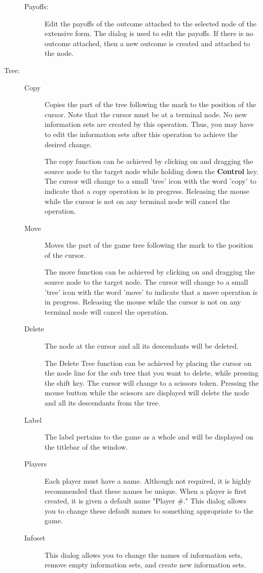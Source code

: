 \begin{description}
\begin{description}
\item[Payoffs:] Edit the payoffs of the outcome attached to the
selected node of the extensive form. The  dialog is used to edit the payoffs. If there is
no outcome attached, then a new outcome is created and attached to the
node.
\end{description}
\item[Tree:]
\begin{description}
\item[Copy] Copies the part of the tree following the mark to the
position of the cursor.  Note that the cursor must be at a terminal
node.  No new information sets are created by this operation.  Thus,
you may have to edit the information sets after this operation to
achieve the desired change.

 The copy function can be
achieved by clicking on and dragging the source node to the target
node while holding down the {\bf Control} key.  The cursor will change
to a small 'tree' icon with the word 'copy' to indicate that a copy
operation is in progress.  Releasing the mouse while the cursor is not
on any terminal node will cancel the operation.
\item[Move] Moves the part of the game tree following the mark to the
position of the cursor.

 The move function can be
achieved by clicking on and dragging the source node to the target
node. The cursor will change to a small 'tree' icon with the word
'move' to indicate that a move operation is in progress.  Releasing
the mouse while the cursor is not on any terminal node will cancel the
operation.
\item[Delete] The node at the cursor and all its descendants will be
deleted.

 The Delete Tree function can be
achieved by placing the cursor on the node line for the sub tree that
you want to delete, while pressing the shift key.  The cursor will
change to a scissors token.  Pressing the mouse button while the
scissors are displayed will delete the node and all its descendants
from the tree.
\item[Label] The label pertains to the game as a whole and will be
displayed on the titlebar of the window.
\item[Players] Each player must have a name.  Although not required,
it is highly recommended that these names be unique.  When a player is
first created, it is given a default name "Player \#."  This dialog
allows you to change these default names to something appropriate to
the game.
\item[Infoset] This dialog allows you to change the names of
information sets, remove empty information sets, and create new
information sets.
\end{description}
\end{description}

